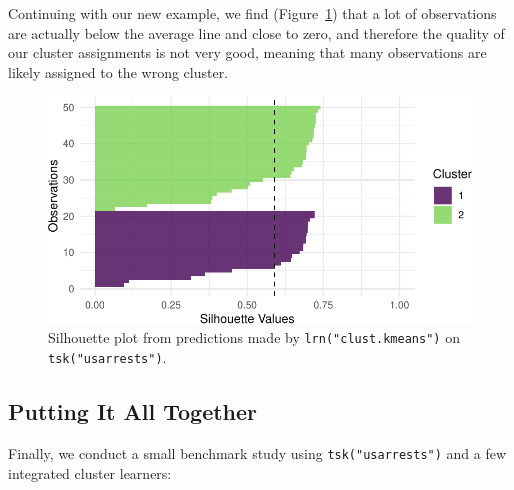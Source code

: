 Continuing with our new example, we find
(Figure~\ref{fig-beyond-clust-sil}) that a lot of observations are
actually below the average line and close to zero, and therefore the
quality of our cluster assignments is not very good, meaning that many
observations are likely assigned to the wrong cluster.

\begin{Shaded}
\begin{Highlighting}[]
 \NormalTok{)}
\end{Highlighting}
\end{Shaded}

\begin{figure}[H]

{\centering \includegraphics[width=1\textwidth,height=\textheight]{chapters/chapter13/beyond_regression_and_classification_files/figure-pdf/fig-beyond-clust-sil-1.pdf}

}

\caption{\label{fig-beyond-clust-sil}Silhouette plot from predictions
made by \texttt{lrn("clust.kmeans")} on \texttt{tsk("usarrests")}.}

\end{figure}

\hypertarget{sec-cluster-all}{%
\subsection{Putting It All Together}\label{sec-cluster-all}}

Finally, we conduct a small benchmark study using
\texttt{tsk("usarrests")} and a few integrated cluster learners:

